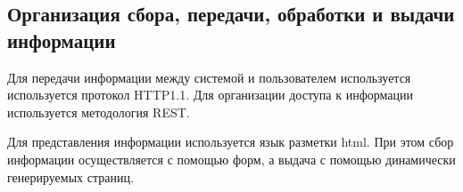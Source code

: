 \subsection{Организация сбора, передачи, обработки и выдачи информации}

Для передачи информации между системой и пользователем используется используется протокол HTTP1.1. Для организации доступа к информации используется методология REST.

Для представления информации используется язык разметки html. При этом сбор информации осуществляется с помощью форм, а выдача с помощью динамически генерируемых страниц.
